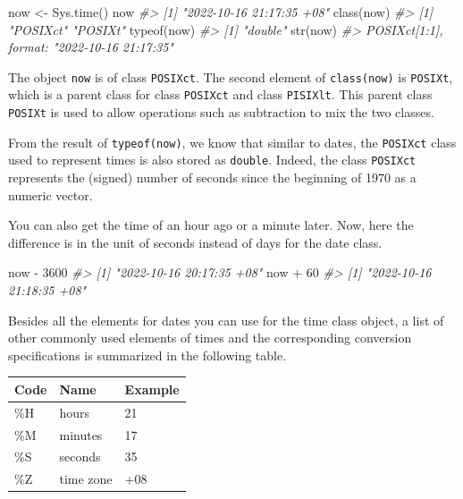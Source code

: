 \documentclass[
]{book}
\newenvironment{Shaded}{\begin{snugshade}}{\end{snugshade}}
\newcommand{\CommentTok}[1]{\textcolor[rgb]{0.56,0.35,0.01}{\textit{#1}}}
\newcommand{\DecValTok}[1]{\textcolor[rgb]{0.00,0.00,0.81}{#1}}
\newcommand{\FunctionTok}[1]{\textcolor[rgb]{0.00,0.00,0.00}{#1}}
\newcommand{\NormalTok}[1]{#1}
\newcommand{\OtherTok}[1]{\textcolor[rgb]{0.56,0.35,0.01}{#1}}
\newcommand{\SpecialCharTok}[1]{\textcolor[rgb]{0.00,0.00,0.00}{#1}}
\begin{document}
\begin{Shaded}
\begin{Highlighting}[]
\NormalTok{now }\OtherTok{\textless{}{-}} \FunctionTok{Sys.time}\NormalTok{()}
\NormalTok{now}
\CommentTok{\#\textgreater{} [1] "2022{-}10{-}16 21:17:35 +08"}
\FunctionTok{class}\NormalTok{(now)}
\CommentTok{\#\textgreater{} [1] "POSIXct" "POSIXt"}
\FunctionTok{typeof}\NormalTok{(now)}
\CommentTok{\#\textgreater{} [1] "double"}
\FunctionTok{str}\NormalTok{(now)}
\CommentTok{\#\textgreater{}  POSIXct[1:1], format: "2022{-}10{-}16 21:17:35"}
\end{Highlighting}
\end{Shaded}

The object \texttt{now} is of class \texttt{POSIXct}. The second element of \texttt{class(now)} is \texttt{POSIXt}, which is a parent class for class \texttt{POSIXct} and class \texttt{PISIXlt}. This parent class \texttt{POSIXt} is used to allow operations such as subtraction to mix the two classes.

From the result of \texttt{typeof(now)}, we know that similar to dates, the \texttt{POSIXct} class used to represent times is also stored as \texttt{double}. Indeed, the class \texttt{POSIXct} represents the (signed) number of seconds since the beginning of 1970 as a numeric vector.

You can also get the time of an hour ago or a minute later. Now, here the difference is in the unit of seconds instead of days for the date class.

\begin{Shaded}
\begin{Highlighting}[]
\NormalTok{now }\SpecialCharTok{{-}} \DecValTok{3600}
\CommentTok{\#\textgreater{} [1] "2022{-}10{-}16 20:17:35 +08"}
\NormalTok{now }\SpecialCharTok{+} \DecValTok{60}
\CommentTok{\#\textgreater{} [1] "2022{-}10{-}16 21:18:35 +08"}
\end{Highlighting}
\end{Shaded}

Besides all the elements for dates you can use for the time class object, a list of other commonly used elements of times and the corresponding conversion specifications is summarized in the following table.

\begin{tabular}{l|l|l}
\hline
Code & Name & Example\\
\hline
\%H & hours & 21\\
\hline
\%M & minutes & 17\\
\hline
\%S & seconds & 35\\
\hline
\%Z & time zone & +08\\
\hline
\end{tabular}
\end{document}
